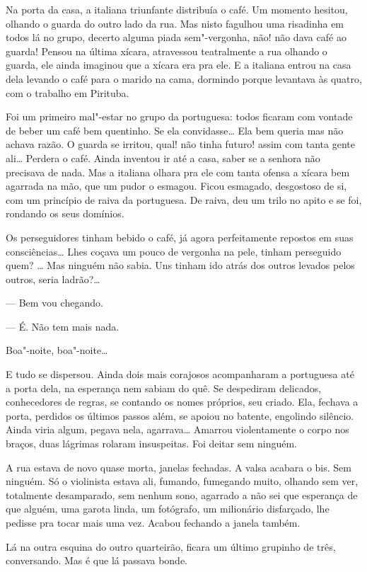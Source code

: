 Na porta da casa, a italiana triunfante distribuía o café. Um momento
hesitou, olhando o guarda do outro lado da rua. Mas nisto fagulhou uma
risadinha em todos lá no grupo, decerto alguma piada sem"-vergonha, não!
não dava café ao guarda! Pensou na última xícara, atravessou
teatralmente a rua olhando o guarda, ele ainda imaginou que a xícara era
pra ele. E a italiana entrou na casa dela levando o café para o marido
na cama, dormindo porque levantava às quatro, com o trabalho em
Pirituba.

Foi um primeiro mal"-estar no grupo da portuguesa: todos ficaram com
vontade de beber um café bem quentinho. Se ela convidasse\ldots{} Ela bem
queria mas não achava razão. O guarda se irritou, qual! não tinha
futuro! assim com tanta gente ali\ldots{} Perdera o café. Ainda inventou ir
até a casa, saber se a senhora não precisava de nada. Mas a italiana
olhara pra ele com tanta ofensa a xícara bem agarrada na mão, que um
pudor o esmagou. Ficou esmagado, desgostoso de si, com um princípio de
raiva da portuguesa. De raiva, deu um trilo no apito e se foi, rondando
os seus domínios.

Os perseguidores tinham bebido o café, já agora perfeitamente repostos
em suas consciências\ldots{} Lhes coçava um pouco de vergonha na pele, tinham
perseguido quem? \ldots{} Mas ninguém não sabia. Uns tinham ido atrás dos
outros levados pelos outros, seria ladrão?\ldots{}

--- Bem vou chegando.

--- É. Não tem mais nada.

Boa"-noite, boa"-noite\ldots{}

E tudo se dispersou. Ainda dois mais corajosos acompanharam a portuguesa
até a porta dela, na esperança nem sabiam do quê. Se despediram
delicados, conhecedores de regras, se contando os nomes próprios, seu
criado. Ela, fechava a porta, perdidos os últimos passos além, se apoiou
no batente, engolindo silêncio. Ainda viria algum, pegava nela,
agarrava\ldots{} Amarrou violentamente o corpo nos braços, duas lágrimas
rolaram insuspeitas. Foi deitar sem ninguém.

A rua estava de novo quase morta, janelas fechadas. A valsa acabara o
bis. Sem ninguém. Só o violinista estava ali, fumando, fumegando muito,
olhando sem ver, totalmente desamparado, sem nenhum sono, agarrado a não
sei que esperança de que alguém, uma garota linda, um fotógrafo, um
milionário disfarçado, lhe pedisse pra tocar mais uma vez. Acabou
fechando a janela também.

Lá na outra esquina do outro quarteirão, ficara um último grupinho de
três, conversando. Mas é que lá passava bonde.

